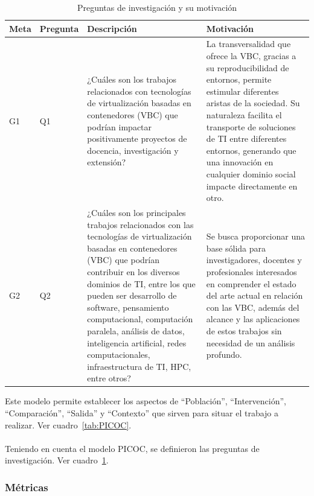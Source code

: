 \begin{table}[!t]
\centering

\renewcommand{\arraystretch}{1.4}
\begin{tabularx}{\textwidth}{>{\centering\arraybackslash}m{} >{\centering\arraybackslash}m{} >{\RaggedRight\arraybackslash}X >{\RaggedRight\arraybackslash}X}
\toprule
\textbf{Meta} & \textbf{Pregunta} & \textbf{Descripción} & \textbf{Motivación} \\
\midrule
G1 & Q1 & ¿Cuáles son los trabajos relacionados con tecnologías de virtualización basadas en contenedores (VBC) que podrían impactar positivamente proyectos de docencia, investigación y extensión? & La transversalidad que ofrece la VBC, gracias a su reproducibilidad de entornos, permite estimular diferentes aristas de la sociedad. Su naturaleza facilita el transporte de soluciones de TI entre diferentes entornos, generando que una innovación en cualquier dominio social impacte directamente en otro. \\
\midrule
G2 & Q2 & ¿Cuáles son los principales trabajos relacionados con las tecnologías de virtualización basadas en contenedores (VBC) que podrían contribuir en los diversos dominios de TI, entre los que pueden ser desarrollo de software, pensamiento computacional, computación paralela, análisis de datos, inteligencia artificial, redes computacionales, infraestructura de TI, HPC, entre otros? & Se busca proporcionar una base sólida para investigadores, docentes y profesionales interesados en comprender el estado del arte actual en relación con las VBC, además del alcance y las aplicaciones de estos trabajos sin necesidad de un análisis profundo. \\
\bottomrule
\end{tabularx}
\caption{Preguntas de investigación y su motivación}
\label{tab:preguntas}
\end{table}

Este modelo permite establecer los aspectos de ``Población'', ``Intervención'', ``Comparación'', ``Salida'' y ``Contexto'' que sirven para situar el trabajo a realizar. Ver cuadro~\ref{tab:PICOC}. \\
\\
Teniendo en cuenta el modelo PICOC, se definieron las preguntas de investigación. Ver cuadro~\ref{tab:preguntas}.\\

\subsubsection{Métricas}
\mbox{}

